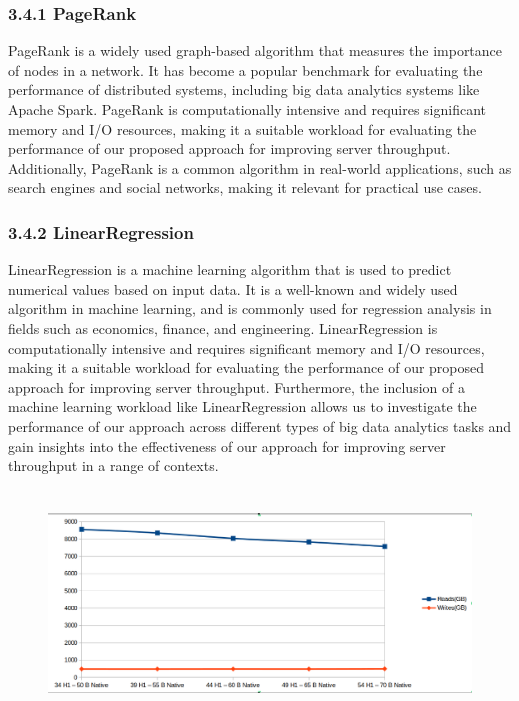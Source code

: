 \documentclass[twocolumn,10pt]{asme2e}
\begin{document}
\subsubsection*{3.4.1 PageRank}
PageRank is a widely used graph-based algorithm that measures the importance of nodes in a network. It has become a popular benchmark for evaluating the performance of distributed systems, including big data analytics systems like Apache Spark. PageRank is computationally intensive and requires significant memory and I/O resources, making it a suitable workload for evaluating the performance of our proposed approach for improving server throughput. Additionally, PageRank is a common algorithm in real-world applications, such as search engines and social networks, making it relevant for practical use cases.

\subsubsection*{3.4.2 LinearRegression}
LinearRegression is a machine learning algorithm that is used to predict numerical values based on input data. It is a well-known and widely used algorithm in machine learning, and is commonly used for regression analysis in fields such as economics, finance, and engineering. LinearRegression is computationally intensive and requires significant memory and I/O resources, making it a suitable workload for evaluating the performance of our proposed approach for improving server throughput. Furthermore, the inclusion of a machine learning workload like LinearRegression allows us to investigate the performance of our approach across different types of big data analytics tasks and gain insights into the effectiveness of our approach for improving server throughput in a range of contexts.

\begin{figure}[h!]
        \includegraphics[width=12cm,height=6cm]{gcs_linr_h1_native.png}
\end{figure}
\end{document}
